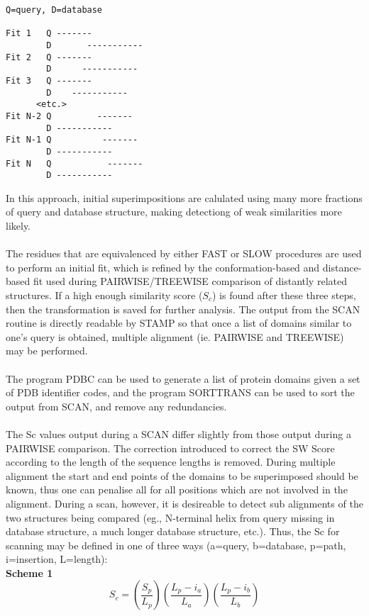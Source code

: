 \begin{verbatim}
Q=query, D=database

Fit 1   Q -------
        D       -----------
Fit 2   Q -------
        D      -----------
Fit 3   Q -------
        D    -----------
      <etc.>
Fit N-2 Q         -------
        D -----------
Fit N-1 Q          -------
        D -----------
Fit N   Q           -------
        D -----------
\end{verbatim}

In this approach, initial superimpositions are calulated using many more fractions of query and
database structure, making detectiong of weak similarities more likely.\\
\\
The residues that are
equivalenced by either FAST or SLOW procedures are used to perform an initial fit, which is
refined by the conformation-based and distance-based fit used during 
PAIRWISE/TREEWISE comparison of distantly related structures.  If a 
high enough similarity score ($S_{c}$) is found after these three
steps, then the transformation is saved for further analysis.
The output from the SCAN routine is directly readable by STAMP so
that once a list of domains similar to one's query is obtained,
multiple alignment (ie. PAIRWISE and TREEWISE) may be performed.\\
\\
The program PDBC can be used to generate a list of protein domains 
given a set of PDB identifier codes, and the program SORTTRANS can
be used to sort the output from SCAN, and remove any redundancies.\\
\\
The Sc values output during a SCAN differ slightly from those
output during a PAIRWISE comparison.  The correction  introduced 
to correct the SW Score according to the length of the sequence 
lengths is removed.   During multiple alignment the start and end  
points of the domains to be superimposed should be known, thus one 
can penalise all for all positions which are not involved in the 
alignment.  During a scan, however, it is desireable to detect sub 
alignments of the two structures being compared (eg., N-terminal helix 
from query missing in database structure, a much longer database 
structure, etc.).  Thus, the Sc for scanning may be defined in one of 
three ways (a=query, b=database, p=path, i=insertion, L=length):\\

{\bf Scheme 1}\\
\[
S_{c} =
\left(
\frac{S_{p}}{L_{p}}
\right)
\left(
\frac{L_{p}-i_{a}}{L_{a}}
\right)
\left(
\frac{L_{p}-i_{b}}{L_{b}}
\right)
\]

